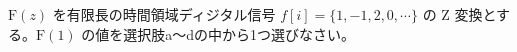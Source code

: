 $\textrm{F}(z)$ を有限長の時間領域ディジタル信号 $f[i] = \{1, -1, 2,  0, \cdots \}$ の Z 変換とする。$\textrm{F}(1)$ の値を選択肢a〜dの中から1つ選びなさい。
